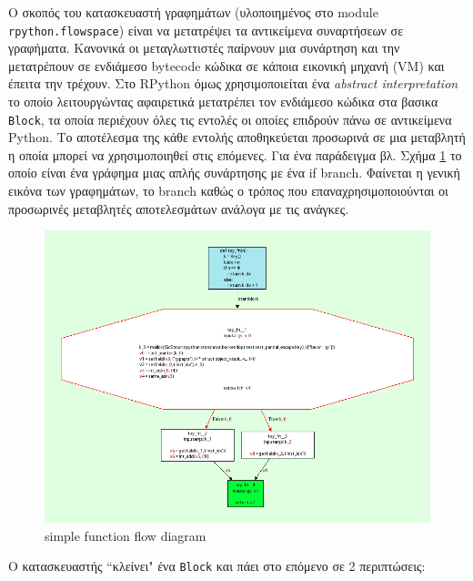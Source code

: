 Ο σκοπός του κατασκευαστή γραφημάτων (υλοποιημένος στο module
\texttt{rpython.flowspace}) είναι να μετατρέψει τα αντικείμενα συναρτήσεων σε
γραφήματα. Κανονικά οι μεταγλωττιστές παίρνουν μια συνάρτηση και την
μετατρέπουν σε ενδιάμεσο bytecode κώδικα σε κάποια εικονική μηχανή (VM) και
έπειτα την τρέχουν. Στο RPython όμως χρησιμοποιείται ένα \textit{abstract
interpretation} το οποίο λειτουργώντας αφαιρετικά μετατρέπει τον ενδιάμεσο
κώδικα στα βασικα \texttt{Block}, τα οποία περιέχουν όλες τις εντολές οι
οποίες επιδρούν πάνω σε αντικείμενα Python. Το αποτέλεσμα της κάθε εντολής
αποθηκεύεται προσωρινά σε μια μεταβλητή η οποία μπορεί να χρησιμοποιηθεί στις
επόμενες. Για ένα παράδειγμα βλ. Σχήμα \ref{figure-2} το οποίο είναι ένα
γράφημα μιας απλής συνάρτησης με ένα if branch. Φαίνεται η γενική εικόνα των
γραφημάτων, το branch καθώς ο τρόπος που επαναχρησιμοποιούνται οι προσωρινές
μεταβλητές αποτελεσμάτων ανάλογα με τις ανάγκες.

\begin{figure}[h]
\centering
\includegraphics[width=\textwidth]{simple-func-bef.png}
\caption{simple function flow diagram}
\label{figure-2}
\end{figure}

Ο κατασκευαστής ``κλείνει" ένα \texttt{Block} και πάει στο επόμενο σε 2 
περιπτώσεις:

